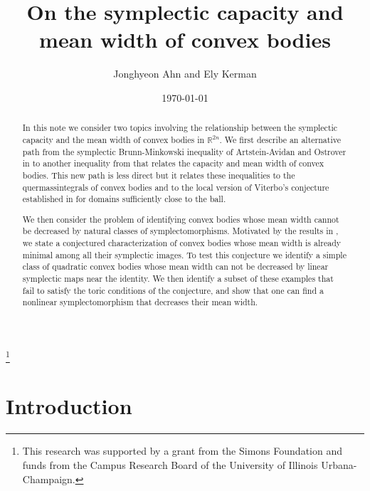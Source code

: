 \documentclass[12pt]{amsart}
\theoremstyle{definition}
\newcommand{\RR}{{\mathbb R}}
\begin{document}
\title[On the symplectic capacity and mean width of convex bodies]{On the symplectic capacity and mean width of convex bodies}
\author{Jonghyeon Ahn and Ely Kerman}
\address{Department of Mathematics,
University of Illinois Urbana-Champaign\\Urbana, IL, 61801, USA.}
\thanks{This research was supported by a grant from the Simons Foundation and funds from the Campus Research Board of the University of Illinois Urbana-Champaign.}

\date{\today}


\begin{abstract}
In this note we consider two topics involving the relationship between the symplectic capacity and the mean width of convex bodies in $\RR^{2n}$. We first describe an alternative path from the symplectic Brunn-Minkowski inequality of Artstein-Avidan and Ostrover in \cite{ao} to another inequality from \cite {ao} that relates the capacity and mean width of convex bodies. This new path is less direct but it relates these inequalities to the quermassintegrals of convex bodies and to the local version of Viterbo's conjecture established in \cite{ab} for domains sufficiently close to the ball. 

We then consider the problem of identifying convex bodies whose mean width cannot be decreased by natural classes of symplectomorphisms. Motivated by the results in \cite{ak}, we state a conjectured characterization of convex bodies whose mean width is already minimal among all their symplectic images. To test this conjecture we identify a simple class of quadratic convex bodies whose mean width can not be decreased by linear symplectic maps near the identity. We then identify a subset of these examples that fail to satisfy the toric conditions of the conjecture, and show that one can find a nonlinear symplectomorphism that decreases their mean width. 
\end{abstract}



\maketitle

\section{Introduction}   
\end{document}

